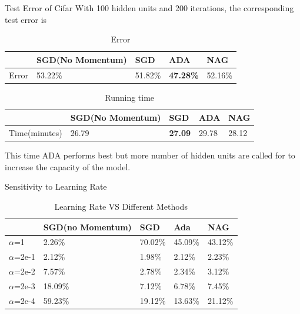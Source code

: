 \documentclass{beamer}
\begin{document}
\begin{frame}{Test Error of Cifar}
With 100 hidden units and 200 iterations, the corresponding test error is 
\begin{table}[h]
\begin{tabular}{|l|l|l|l|l|}
\hline
      & SGD(No Momentum) & SGD    & ADA    & NAG    \\ \hline
Error & 53.22\%           & 51.82\% & \textbf{47.28\%} & 52.16\% \\ \hline
\end{tabular}
\caption{Error}
\label{my-label}
\end{table}


\begin{table}[h]
\begin{tabular}{|l|l|l|l|l|}
\hline
             & SGD(No Momentum) & SGD    & ADA  & NAG  \\ \hline
Time(minutes) & 26.79           & \textbf{27.09} & 29.78 & 28.12 \\ \hline
\end{tabular}
\caption{Running time}
\label{my-label}
\end{table}
This time ADA performs best but more number of hidden units are called for to increase the capacity of the model. 

\end{frame}






\begin{frame}{Sensitivity to Learning Rate}
\begin{table}[h]
\begin{tabular}{|l|l|l|l|l|}
\hline
            & SGD(no Momentum) & SGD     & Ada     & NAG     \\\hline
$\alpha$=1    & \color{red}2.26\%           & 70.02\% & 45.09\% & 43.12\% \\\hline
$\alpha$=2e-1 & 2.12\%           &\color{red} 1.98\%  & 2.12\%  & 2.23\%  \\\hline
$\alpha$=2e-2 & 7.57\%           & 2.78\%  & \color{red} 2.34\%  & 3.12\%  \\\hline
$\alpha$=2e-3 & 18.09\%          & 7.12\%  &\color{red}  6.78\%  & 7.45\%  \\\hline
$\alpha$=2e-4 & 59.23\%          & 19.12\% & \color{red} 13.63\% &   21.12\% \\    \hline
\end{tabular}
\caption{Learning Rate VS Different Methods}
\label{my-label}
\end{table}
\end{frame}
\end{document}
